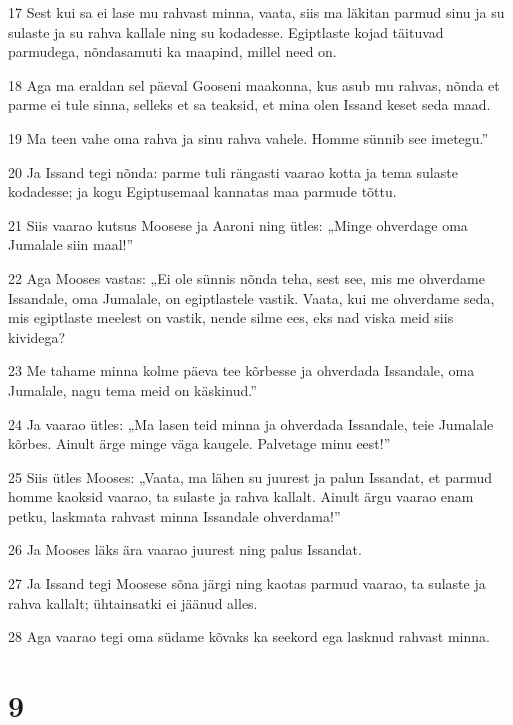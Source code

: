 \par 17 Sest kui sa ei lase mu rahvast minna, vaata, siis ma läkitan parmud sinu ja su sulaste ja su rahva kallale ning su kodadesse. Egiptlaste kojad täituvad parmudega, nõndasamuti ka maapind, millel need on.
\par 18 Aga ma eraldan sel päeval Gooseni maakonna, kus asub mu rahvas, nõnda et parme ei tule sinna, selleks et sa teaksid, et mina olen Issand keset seda maad.
\par 19 Ma teen vahe oma rahva ja sinu rahva vahele. Homme sünnib see imetegu.”
\par 20 Ja Issand tegi nõnda: parme tuli rängasti vaarao kotta ja tema sulaste kodadesse; ja kogu Egiptusemaal kannatas maa parmude tõttu.
\par 21 Siis vaarao kutsus Moosese ja Aaroni ning ütles: „Minge ohverdage oma Jumalale siin maal!”
\par 22 Aga Mooses vastas: „Ei ole sünnis nõnda teha, sest see, mis me ohverdame Issandale, oma Jumalale, on egiptlastele vastik. Vaata, kui me ohverdame seda, mis egiptlaste meelest on vastik, nende silme ees, eks nad viska meid siis kividega?
\par 23 Me tahame minna kolme päeva tee kõrbesse ja ohverdada Issandale, oma Jumalale, nagu tema meid on käskinud.”
\par 24 Ja vaarao ütles: „Ma lasen teid minna ja ohverdada Issandale, teie Jumalale kõrbes. Ainult ärge minge väga kaugele. Palvetage minu eest!”
\par 25 Siis ütles Mooses: „Vaata, ma lähen su juurest ja palun Issandat, et parmud homme kaoksid vaarao, ta sulaste ja rahva kallalt. Ainult ärgu vaarao enam petku, laskmata rahvast minna Issandale ohverdama!”
\par 26 Ja Mooses läks ära vaarao juurest ning palus Issandat.
\par 27 Ja Issand tegi Moosese sõna järgi ning kaotas parmud vaarao, ta sulaste ja rahva kallalt; ühtainsatki ei jäänud alles.
\par 28 Aga vaarao tegi oma südame kõvaks ka seekord ega lasknud rahvast minna.

\chapter{9}

